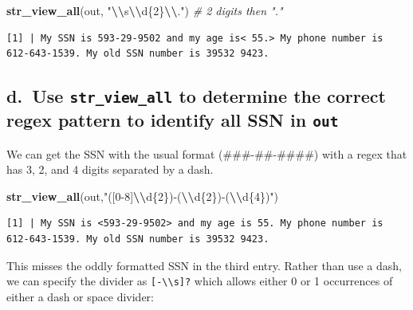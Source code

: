 \documentclass[
]{book}
\newenvironment{Shaded}{\begin{snugshade}}{\end{snugshade}}
\newcommand{\CommentTok}[1]{\textcolor[rgb]{0.56,0.35,0.01}{\textit{#1}}}
\newcommand{\FunctionTok}[1]{\textcolor[rgb]{0.13,0.29,0.53}{\textbf{#1}}}
\newcommand{\NormalTok}[1]{#1}
\newcommand{\SpecialCharTok}[1]{\textcolor[rgb]{0.81,0.36,0.00}{\textbf{#1}}}
\newcommand{\StringTok}[1]{\textcolor[rgb]{0.31,0.60,0.02}{#1}}
\begin{document}
\begin{Shaded}
\begin{Highlighting}[]
\FunctionTok{str\_view\_all}\NormalTok{(out, }\StringTok{"}\SpecialCharTok{\textbackslash{}\textbackslash{}}\StringTok{s}\SpecialCharTok{\textbackslash{}\textbackslash{}}\StringTok{d\{2\}}\SpecialCharTok{\textbackslash{}\textbackslash{}}\StringTok{."}\NormalTok{)  }\CommentTok{\# 2 digits then "."}
\end{Highlighting}
\end{Shaded}

\begin{verbatim}
[1] | My SSN is 593-29-9502 and my age is< 55.> My phone number is 612-643-1539. My old SSN number is 39532 9423.
\end{verbatim}

\hypertarget{d.-use-str_view_all-to-determine-the-correct-regex-pattern-to-identify-all-ssn-in-out}{%
\subsection{\texorpdfstring{d.~Use \texttt{str\_view\_all} to determine the correct regex pattern to identify all SSN in \texttt{out}}{d.~Use str\_view\_all to determine the correct regex pattern to identify all SSN in out}}\label{d.-use-str_view_all-to-determine-the-correct-regex-pattern-to-identify-all-ssn-in-out}}

We can get the SSN with the usual format (\#\#\#-\#\#-\#\#\#\#) with a regex that has 3, 2, and 4 digits separated by a dash.

\begin{Shaded}
\begin{Highlighting}[]
\FunctionTok{str\_view\_all}\NormalTok{(out,}\StringTok{"([0{-}8]}\SpecialCharTok{\textbackslash{}\textbackslash{}}\StringTok{d\{2\}){-}(}\SpecialCharTok{\textbackslash{}\textbackslash{}}\StringTok{d\{2\}){-}(}\SpecialCharTok{\textbackslash{}\textbackslash{}}\StringTok{d\{4\})"}\NormalTok{)}
\end{Highlighting}
\end{Shaded}

\begin{verbatim}
[1] | My SSN is <593-29-9502> and my age is 55. My phone number is 612-643-1539. My old SSN number is 39532 9423.
\end{verbatim}

This misses the oddly formatted SSN in the third entry. Rather than use a dash, we can specify the divider as \texttt{{[}-\textbackslash{}\textbackslash{}s{]}?} which allows either 0 or 1 occurrences of either a dash or space divider:
\end{document}
